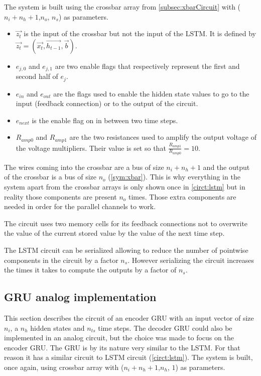 The system is built using the crossbar array from \cref{subsec:xbarCircuit} with ($n_i+n_h+1$,$n_o$, $n_s$) as parameters.

\begin{itemize}
  \item $\overrightarrow{z_t}$ is the input of the crossbar but not the input of the \ac{LSTM}. It is defined by $\overrightarrow{z_t}=(\overrightarrow{x_t},\overrightarrow{h_{t-1}},\overrightarrow{b})$.
  \item $e_{j,0}$ and $e_{j,1}$ are two enable flags that respectively represent the first and second half of $e_j$.
  \item $e_{in}$ and $e_{out}$ are the flags used to enable the hidden state values to go to the input (feedback connection) or to the output of the circuit.
  \item $e_{next}$ is the enable flag on in between two time steps.
  \item $R_{amp0}$ and $R_{amp1}$ are the two resistances used to amplify the output voltage of the voltage multipliers. Their value is set so that $\frac{R_{amp1}}{R_{amp0}}=10$.
\end{itemize}

The wires coming into the crossbar are a bus of size $n_i+n_h+1$ and the output of the crossbar is a bus of size $n_o$ (\cref{sym:xbar}). This is why everything in the system apart from the crossbar arrays is only shown once in \cref{circt:lstm} but in reality those components are present $n_o$ times. Those extra components are needed in order for the parallel channels to work.

The circuit uses two memory cells for its feedback connections not to overwrite the value of the current stored value by the value of the next time step.

The LSTM circuit can be serialized allowing to reduce the number of pointwise components in the circuit by a factor $n_s$. However serializing the circuit increases the times it takes to compute the outputs by a factor of $n_s$.

\subsection{GRU analog implementation}

This section describes the circuit of an encoder \ac{GRU} with an input vector of size $n_i$, a $n_h$ hidden states and $n_{ts}$ time steps. The decoder \ac{GRU} could also be implemented in an analog circuit, but the choice was made to focus on the encoder \ac{GRU}. The \ac{GRU} is by its nature very similar to the \ac{LSTM}. For that reason it has a similar circuit to LSTM circuit (\cref{circt:lstm}). The system is built, once again, using crossbar array with ($n_i+n_h+1$,$n_h$, $1$) as parameters.

